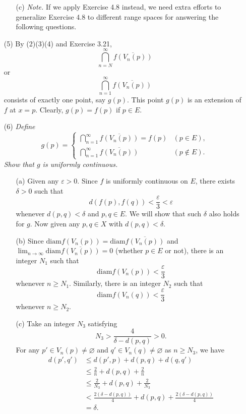 \documentclass{article}
\begin{document}
\begin{enumerate}
\begin{enumerate}
  \item[(c)]
  \emph{Note.}
  If we apply Exercise 4.8 instead,
  we need extra efforts to generalize Exercise 4.8
  to different range spaces for answering the following questions.
\end{enumerate}

\item[(5)]
By (2)(3)(4) and Exercise 3.21,
\[
  \bigcap_{n=N}^{\infty} \overline{f(V_n(p))}
\]
or
\[
  \bigcap_{n=1}^{\infty} \overline{f(V_n(p))}
\]
consists of exactly one point, say $g(p)$.
This point $g(p)$ is an extension of $f$ at $x = p$.
Clearly, $g(p) = f(p)$ if $p \in E$.

\item[(6)]
\emph{Define
\begin{equation*}
  g(p) =
    \begin{cases}
      \bigcap_{n=1}^{\infty} \overline{f(V_n(p))} = f(p)
        & (p \in E), \\
      \bigcap_{n=1}^{\infty} \overline{f(V_n(p))}
        & (p \not\in E).
    \end{cases}
\end{equation*}
Show that $g$ is uniformly continuous.}
  \begin{enumerate}
  \item[(a)]
  Given any $\varepsilon > 0$.
  Since $f$ is uniformly continuous on $E$,
  there exists $\delta > 0$ such that
  \[
    d(f(p),f(q)) < \frac{\varepsilon}{3} < \varepsilon
  \]
  whenever $d(p,q) < \delta$ and $p, q \in E$.
  We will show that such $\delta$ also holds for $g$.
  Now given any $p, q \in X$ with $d(p,q) < \delta$.

  \item[(b)]
  Since $\mathrm{diam} f(V_n(p)) = \mathrm{diam} \overline{f(V_n(p))}$
  and $\lim_{n \to \infty} \mathrm{diam} \overline{f(V_n(p))} = 0$
  (whether $p \in E$ or not),
  there is an integer $N_1$ such that
  \[
    \mathrm{diam} f(V_n(p)) < \frac{\varepsilon}{3}
  \]
  whenever $n \geq N_1$.
  Similarly,
  there is an integer $N_2$ such that
  \[
    \mathrm{diam} f(V_n(q)) < \frac{\varepsilon}{3}
  \]
  whenever $n \geq N_2$.

  \item[(c)]
  Take an integer $N_3$ satisfying
  \[
    N_3 > \frac{4}{\delta-d(p,q)} > 0.
  \]
  For any $p' \in V_n(p) \neq \varnothing$ and
  $q' \in V_n(q) \neq \varnothing$ as $n \geq N_3$,
  we have
  \begin{align*}
    d(p',q')
    &\leq d(p',p) + d(p,q) + d(q,q') \\
    &\leq \frac{2}{n} + d(p,q) + \frac{2}{n} \\
    &\leq \frac{2}{N_3} + d(p,q) + \frac{2}{N_3} \\
    &< \frac{2(\delta-d(p,q))}{4} + d(p,q) + \frac{2(\delta-d(p,q))}{4} \\
    &= \delta.
  \end{align*}


\end{enumerate}
\end{enumerate}
\end{document}
